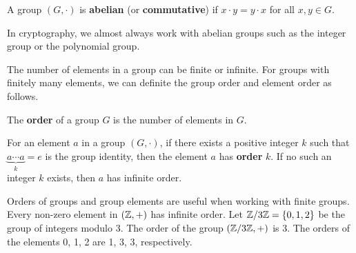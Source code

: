 \documentclass[../main.tex]{subfiles}
\begin{document}
\begin{definition}
A group $(G,\cdot)$ is \textbf{abelian} (or \textbf{commutative}) if $x \cdot y = y \cdot x$ for all $x,y \in G$. 
\end{definition}
In cryptography, we almost always work with abelian groups such as the integer group or the polynomial group. 

The number of elements in a group can be finite or infinite. For groups with finitely many elements, we can definite the group order and element order as follows.

\begin{definition}
The \textbf{order} of a group $G$ is the number of elements in $G$.\reversemarginpar
{}
\end{definition}

\begin{definition}
For an element $a$ in a group $(G,\cdot)$, if there exists a positive integer $k$ such that $\underbrace{a \cdots a}_{k}=e$ is the group identity, then the element $a$ has \textbf{order} $k$. If no such an integer $k$ exists, then $a$ has infinite order. 
\end{definition}

Orders of groups and group elements are useful when working with finite groups. Every non-zero element in $(\mathbb{Z}, +)$ has infinite order. Let $\mathbb{Z}/3\mathbb{Z}=\{0,1,2\}$ be the group of integers modulo 3. The order of the group $(\mathbb{Z}/3\mathbb{Z}, +)$ is 3. The orders of the elements 0, 1, 2 are 1, 3, 3, respectively.
\end{document}
